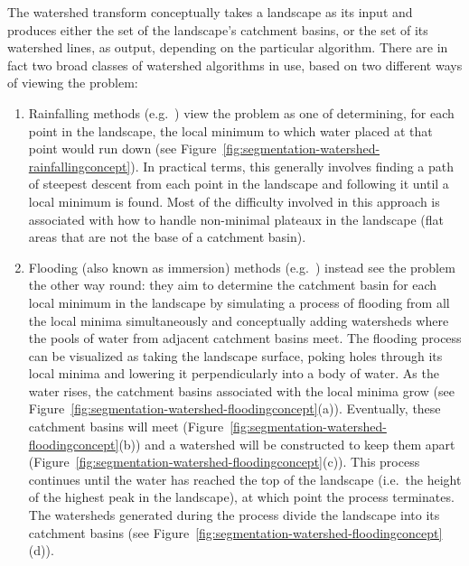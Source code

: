 The watershed transform conceptually takes a landscape as its input and produces either the set of the landscape's catchment basins, or the set of its watershed lines, as output, depending on the particular algorithm. There are in fact two broad classes of watershed algorithms in use, based on two different ways of viewing the problem:
%
\begin{enumerate}

\item Rainfalling methods (e.g.~\cite{meijster98,osma-ruiz06,stoev00}) view the problem as one of determining, for each point in the landscape, the local minimum to which water placed at that point would run down (see Figure~\ref{fig:segmentation-watershed-rainfallingconcept}). In practical terms, this generally involves finding a path of steepest descent from each point in the landscape and following it until a local minimum is found. Most of the difficulty involved in this approach is associated with how to handle non-minimal plateaux in the landscape (flat areas that are not the base of a catchment basin).

\item Flooding (also known as immersion) methods (e.g.~\cite{bieniek00,rambabu07}) instead see the problem the other way round: they aim to determine the catchment basin for each local minimum in the landscape by simulating a process of flooding from all the local minima simultaneously and conceptually adding watersheds where the pools of water from adjacent catchment basins meet. The flooding process can be visualized as taking the landscape surface, poking holes through its local minima and lowering it perpendicularly into a body of water. As the water rises, the catchment basins associated with the local minima grow (see Figure~\ref{fig:segmentation-watershed-floodingconcept}(a)). Eventually, these catchment basins will meet (Figure~\ref{fig:segmentation-watershed-floodingconcept}(b)) and a watershed will be constructed to keep them apart (Figure~\ref{fig:segmentation-watershed-floodingconcept}(c)). This process continues until the water has reached the top of the landscape (i.e.~the height of the highest peak in the landscape), at which point the process terminates. The watersheds generated during the process divide the landscape into its catchment basins (see Figure~\ref{fig:segmentation-watershed-floodingconcept}(d)).

\end{enumerate}

